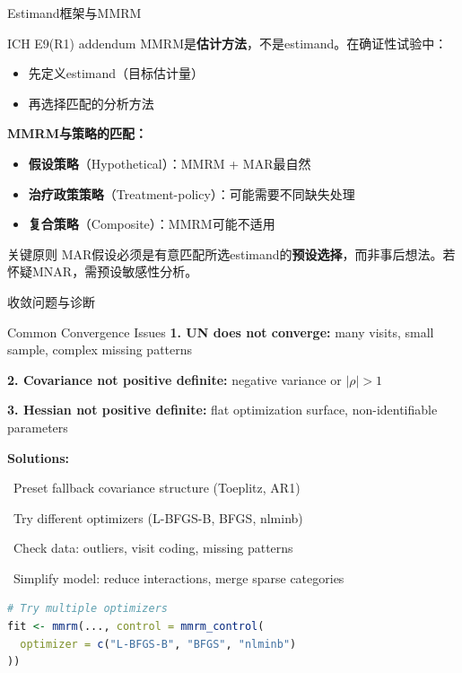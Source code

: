 \documentclass[aspectratio=169,11pt]{beamer}
\begin{document}
\begin{frame}{Estimand框架与MMRM}
\begin{block}{ICH E9(R1) addendum}
MMRM是\textbf{估计方法}，不是estimand。在确证性试验中：
\begin{itemize}
    \item 先定义estimand（目标估计量）
    \item 再选择匹配的分析方法
\end{itemize}
\end{block}

\textbf{MMRM与策略的匹配：}
\begin{itemize}
    \item \textbf{假设策略}（Hypothetical）：MMRM + MAR最自然
    \item \textbf{治疗政策策略}（Treatment-policy）：可能需要不同缺失处理
    \item \textbf{复合策略}（Composite）：MMRM可能不适用
\end{itemize}

\begin{alertblock}{关键原则}
MAR假设必须是有意匹配所选estimand的\textbf{预设选择}，而非事后想法。若怀疑MNAR，需预设敏感性分析。
\end{alertblock}
\end{frame}

\begin{frame}[fragile]{收敛问题与诊断}
\begin{block}{Common Convergence Issues}
\textbf{1. UN does not converge:} many visits, small sample, complex missing patterns

\textbf{2. Covariance not positive definite:} negative variance or $|\rho|>1$

\textbf{3. Hessian not positive definite:} flat optimization surface, non-identifiable parameters
\end{block}

\vspace{0.1cm}
\textbf{Solutions:}

\textbullet~Preset fallback covariance structure (Toeplitz, AR1)

\textbullet~Try different optimizers (L-BFGS-B, BFGS, nlminb)

\textbullet~Check data: outliers, visit coding, missing patterns

\textbullet~Simplify model: reduce interactions, merge sparse categories

\vspace{0.1cm}
\begin{lstlisting}[language=R,basicstyle=\ttfamily\scriptsize]
# Try multiple optimizers
fit <- mmrm(..., control = mmrm_control(
  optimizer = c("L-BFGS-B", "BFGS", "nlminb")
))
\end{lstlisting}
\end{frame}
\end{document}

